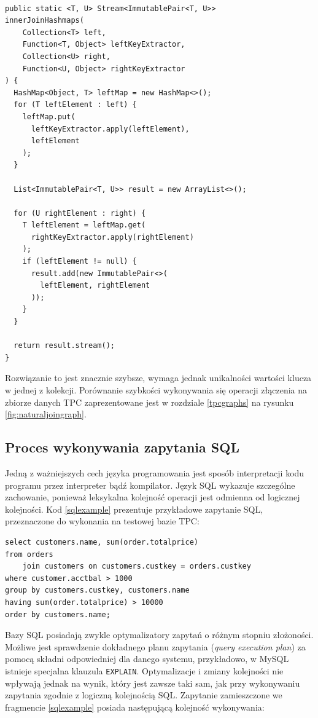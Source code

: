 \documentclass[12pt,twoside,openright]{extarticle}
\begin{document}
\begin{lstlisting}[label=join3, caption=Rozwiązanie nr 3]

public static <T, U> Stream<ImmutablePair<T, U>> 
innerJoinHashmaps(
    Collection<T> left,
    Function<T, Object> leftKeyExtractor,
    Collection<U> right,
    Function<U, Object> rightKeyExtractor
) {
  HashMap<Object, T> leftMap = new HashMap<>();
  for (T leftElement : left) {
    leftMap.put(
      leftKeyExtractor.apply(leftElement),
      leftElement
    );
  }
  
  List<ImmutablePair<T, U>> result = new ArrayList<>();
  
  for (U rightElement : right) {
    T leftElement = leftMap.get(
      rightKeyExtractor.apply(rightElement)
    );
    if (leftElement != null) {
      result.add(new ImmutablePair<>(
        leftElement, rightElement
      ));
    }
  }
  
  return result.stream();
}
\end{lstlisting}

Rozwiązanie to jest znacznie szybsze, wymaga jednak unikalności wartości klucza w jednej z kolekcji. Porównanie szybkości wykonywania się operacji złączenia na zbiorze danych TPC zaprezentowane jest w rozdziale \ref{tpcgraphs} na rysunku \ref{fig:naturaljoingraph}.


\subsection{Proces wykonywania zapytania SQL}

    Jedną z ważniejszych cech języka programowania jest sposób interpretacji kodu programu przez interpreter bądź kompilator. Język SQL wykazuje szczególne zachowanie, ponieważ leksykalna kolejność operacji jest odmienna od logicznej kolejności. Kod \ref{sqlexample} prezentuje przykładowe zapytanie SQL, przeznaczone do wykonania na testowej bazie TPC:


\begin{lstlisting}[label=sqlexample, caption=Przykład kolejności wykonywania zapytania SQL]
select customers.name, sum(order.totalprice)
from orders 
    join customers on customers.custkey = orders.custkey
where customer.acctbal > 1000
group by customers.custkey, customers.name
having sum(order.totalprice) > 10000
order by customers.name;
\end{lstlisting}

    Bazy SQL posiadają zwykle optymalizatory zapytań o różnym stopniu złożoności. Możliwe jest sprawdzenie dokładnego planu zapytania (\textit{query execution plan}) za pomocą składni odpowiedniej dla danego systemu, przykładowo, w MySQL istnieje specjalna klauzula \texttt{EXPLAIN}. Optymalizacje i zmiany kolejności nie wpływają jednak na wynik, który jest zawsze taki sam, jak przy wykonywaniu zapytania zgodnie z logiczną kolejnością SQL. Zapytanie zamieszczone we fragmencie \ref{sqlexample} posiada następującą kolejność wykonywania:
\end{document}
